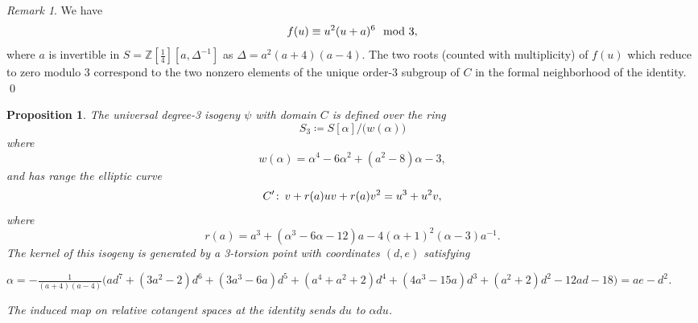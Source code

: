 \documentclass{gtpart}
\newtheorem{prop}[thm]{Proposition}
\theoremstyle{definition}
\theoremstyle{remark}
\newtheorem{rmk}[thm]{Remark}
\def\co{\colon\thinspace}
\newcommand{\mb}[1]{\mathbb{#1}}
\newcommand{\BZ}{{\mb Z}}
\newcommand{\md}{~~{\rm mod}~}
\newcommand{\A}{\alpha}
\begin{document}
\begin{rmk}
\label{rmk:dmod3}
 We have 
 \[
  f(u) \equiv u^2 (u + a)^6 \md 3, 
 \]
 where $a$ is invertible in $S = \BZ [\frac{1}{4}] [a, \Delta^{-1}]$ as $\Delta = a^2 (a + 4) (a - 4)$.  
 The two roots (counted with multiplicity) of $f(u)$ which reduce to zero modulo 3 correspond to 
 the two nonzero elements of the unique order-3 subgroup of $C$ in the formal neighborhood of the identity.  
\qed
\end{rmk}

\begin{prop}
\label{prop:isog}
 The universal degree-3 isogeny $\psi$ with domain $C$ is defined over the ring 
 \[
  S_3 \coloneqq S[\A] \big/ \big( w(\A) \big) 
 \]
 where 
 \[
  w(\A) = \A^4 - 6 \A^2 + (a^2 - 8) \A - 3, 
 \]
 and has range the elliptic curve 
 \[
  C' \co v + r(a) u v + r(a) v^2 = u^3 + u^2 v, 
 \]
 where 
 \[
  r(a) = a^3 + (\A^3 - 6 \A - 12) a - 4 (\A + 1)^2 (\A - 3) a^{-1}.  
 \]
 The kernel of this isogeny is generated by a 3-torsion point with coordinates $(d,e)$ satisfying 

 $\A = -\frac{1}{(a + 4) (a - 4)} \big(a d^7 + (3 a^2 - 2) d^6 + (3 a^3 - 6 a) d^5 + (a^4 + a^2 + 2) d^4 + (4 a^3 - 15 a) d^3 + (a^2 + 2) d^2 - 12 a d -18\big) = a e - d^2$.  

 The induced map on relative cotangent spaces at the identity sends $du$ to $\A du$.  
\end{prop}
\end{document}
